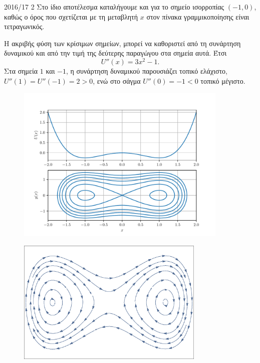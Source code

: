 \begin{solution}{2016/17 2}
    Στο ίδιο αποτέλεσμα καταλήγουμε και για το σημείο ισορροπίας \( (-1,
    0) \), καθώς ο όρος που σχετίζεται με τη μεταβλητή \(x\) στον πίνακα
    γραμμικοποίησης είναι τετραγωνικός.

    Η ακριβής φύση των κρίσιμων σημείων, μπορεί να καθοριστεί από τη συνάρτηση δυναμικού
    και από την τιμή της δεύτερης παραγώγου στα σημεία αυτά. Έτσι
    \begin{equation*}
        U''(x) = 3x^2 - 1.
    \end{equation*}
    Στα σημεία \( 1 \) και \( -1 \), η συνάρτηση δυναμικού παρουσιάζει τοπικό
    ελάχιστο, \( U''(1) = U''(-1) = 2 > 0 \), ενώ στο σάγμα \( U''(0) = -1 < 0
    \) τοπικό μέγιστο.

    \begin{figure}[h]
        \centering
        \includegraphics[width=0.9\textwidth]{figures/ex2_undampedDuffing.pdf}
        \caption{}
        \label{fig:ex2_undampedDuffing}
    \end{figure}
    \begin{figure}[h]
        \centering
        \includegraphics[width=0.8\textwidth]{figures/ex2_undampedDuffingVectorField.eps}

\end{figure}
\end{solution}
